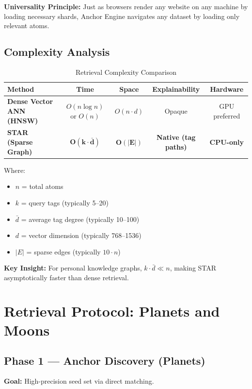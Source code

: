 \documentclass[11pt]{article}
\begin{document}
\textbf{Universality Principle:} Just as browsers render any website on any machine by loading necessary shards, Anchor Engine navigates any dataset by loading only relevant atoms.

\subsection{Complexity Analysis}

\begin{table}[h]
\centering
\caption{Retrieval Complexity Comparison}
\label{tab:complexity}
\begin{tabular}{@{}lcccc@{}}
\toprule
\textbf{Method} & \textbf{Time} & \textbf{Space} & \textbf{Explainability} & \textbf{Hardware} \\ \midrule
\textbf{Dense Vector ANN (HNSW)} & $O(n \log n)$ or $O(n)$ & $O(n \cdot d)$ & Opaque & GPU preferred \\
\textbf{STAR (Sparse Graph)} & $\mathbf{O(k \cdot \bar{d})}$ & $\mathbf{O(|E|)}$ & \textbf{Native (tag paths)} & \textbf{CPU-only} \\ \bottomrule
\end{tabular}
\end{table}

Where:
\begin{itemize}
    \item $n$ = total atoms
    \item $k$ = query tags (typically 5--20)
    \item $\bar{d}$ = average tag degree (typically 10--100)
    \item $d$ = vector dimension (typically 768--1536)
    \item $|E|$ = sparse edges (typically $10 \cdot n$)
\end{itemize}

\textbf{Key Insight:} For personal knowledge graphs, $k \cdot \bar{d} \ll n$, making STAR asymptotically faster than dense retrieval.

\section{Retrieval Protocol: Planets and Moons}
\label{sec:retrieval}

\subsection{Phase 1 --- Anchor Discovery (Planets)}

\textbf{Goal:} High-precision seed set via direct matching.
\end{document}
